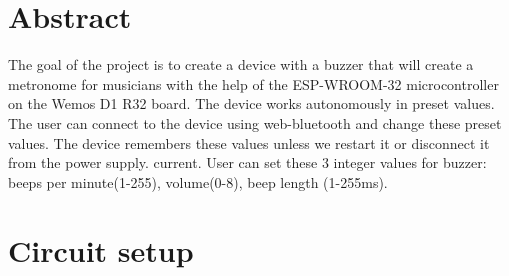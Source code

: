 \documentclass[a4paper, 11pt, twocolumn]{article}
\begin{document}
	\section{Abstract}

	The goal of the project is to create a device with a buzzer that will create a metronome for musicians
     with the help of the ESP-WROOM-32 microcontroller on the Wemos D1 R32 board. The device works
     autonomously in preset values. The user can connect to the device using
     web-bluetooth and change these preset values. The device remembers these
     values unless we restart it or disconnect it from the power supply. current. User can set
     these 3 integer values for buzzer: beeps per minute(1-255), volume(0-8), beep length (1-255ms).
    



	\section{Circuit setup}
\end{document}
